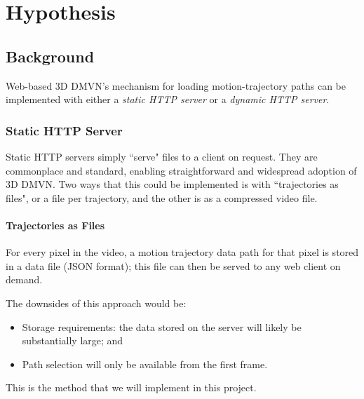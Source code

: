 \chapter{Hypothesis}

\section{Background}
Web-based 3D DMVN's mechanism for loading motion-trajectory paths can be implemented with either a \emph{static HTTP server} or a \emph{dynamic HTTP server}.

\subsection{Static HTTP Server}
Static HTTP servers simply ``serve" files to a client on request.\cite{staticweb} They are commonplace and standard, enabling straightforward and widespread adoption of 3D DMVN. Two ways that this could be implemented is with ``trajectories as files", or a file per trajectory, and the other is as a compressed video file.

\subsubsection{Trajectories as Files}
For every pixel in the video, a motion trajectory data path for that pixel is stored in a data file (JSON format); this file can then be served to any web client on demand.
\par The downsides of this approach would be:
\begin{itemize}
    \item Storage requirements: the data stored on the server will likely be substantially large; and
    \item Path selection will only be available from the first frame.
\end{itemize}
\par This is the method that we will implement in this project.
